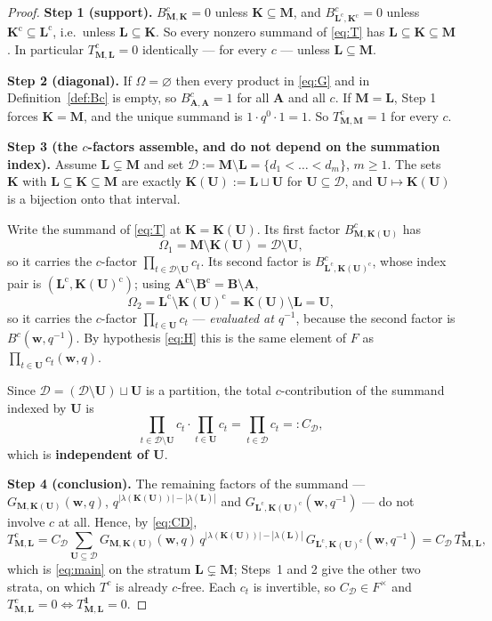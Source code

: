 \documentclass[11pt]{article}
\theoremstyle{plain}
\theoremstyle{definition}
\theoremstyle{remark}
\newcommand{\bM}{\mathbf M}
\newcommand{\bK}{\mathbf K}
\newcommand{\bL}{\mathbf L}
\newcommand{\bU}{\mathbf U}
\newcommand{\bA}{\mathbf A}
\newcommand{\bB}{\mathbf B}
\newcommand{\bw}{\mathbf w}
\newcommand{\cD}{\mathcal D}
\newcommand{\cm}{{\mathrm c}}
\begin{document}
\begin{proof}
\textbf{Step 1 (support).}
$B^c_{\bM,\bK}=0$ unless $\bK\subseteq\bM$, and $B^c_{\bL^\cm,\bK^\cm}=0$ unless
$\bK^\cm\subseteq\bL^\cm$, i.e.\ unless $\bL\subseteq\bK$. So every nonzero
summand of \eqref{eq:T} has $\bL\subseteq\bK\subseteq\bM$. In particular
$T^c_{\bM,\bL}=0$ identically --- for every $c$ --- unless $\bL\subseteq\bM$.

\textbf{Step 2 (diagonal).}
If $\Omega=\varnothing$ then every product in \eqref{eq:G} and in
Definition~\ref{def:Bc} is empty, so $B^c_{\bA,\bA}=1$ for all $\bA$ and all $c$.
If $\bM=\bL$, Step 1 forces $\bK=\bM$, and the unique summand is
$1\cdot q^{0}\cdot1=1$. So $T^c_{\bM,\bM}=1$ for every $c$.

\textbf{Step 3 (the $c$-factors assemble, and do not depend on the summation
index).}
Assume $\bL\subsetneq\bM$ and set $\cD:=\bM\setminus\bL=\{d_1<\dots<d_m\}$,
$m\ge1$. The sets $\bK$ with $\bL\subseteq\bK\subseteq\bM$ are exactly
$\bK(\bU):=\bL\sqcup\bU$ for $\bU\subseteq\cD$, and $\bU\mapsto\bK(\bU)$ is a
bijection onto that interval.

Write the summand of \eqref{eq:T} at $\bK=\bK(\bU)$. Its first factor
$B^c_{\bM,\bK(\bU)}$ has
\[
\Omega_1=\bM\setminus\bK(\bU)=\cD\setminus\bU ,
\]
so it carries the $c$-factor $\prod_{t\in\cD\setminus\bU}c_t$. Its second factor
is $B^c_{\bL^\cm,\bK(\bU)^\cm}$, whose index pair is $(\bL^\cm,\bK(\bU)^\cm)$;
using $\bA^\cm\setminus\bB^\cm=\bB\setminus\bA$,
\[
\Omega_2=\bL^\cm\setminus\bK(\bU)^\cm=\bK(\bU)\setminus\bL=\bU ,
\]
so it carries the $c$-factor $\prod_{t\in\bU}c_t$ --- \emph{evaluated at $q^{-1}$},
because the second factor is $B^c(\bw,q^{-1})$. By hypothesis \eqref{eq:H} this
is the same element of $F$ as $\prod_{t\in\bU}c_t(\bw,q)$.

Since $\cD=(\cD\setminus\bU)\sqcup\bU$ is a partition, the total $c$-contribution
of the summand indexed by $\bU$ is
\begin{equation}
\prod_{t\in\cD\setminus\bU}c_t\cdot\prod_{t\in\bU}c_t
=\prod_{t\in\cD}c_t=:C_\cD ,
\label{eq:CD}
\end{equation}
which is \textbf{independent of $\bU$}.

\textbf{Step 4 (conclusion).}
The remaining factors of the summand --- $G_{\bM,\bK(\bU)}(\bw,q)$,
$q^{|\lambda(\bK(\bU))|-|\lambda(\bL)|}$ and $G_{\bL^\cm,\bK(\bU)^\cm}(\bw,q^{-1})$
--- do not involve $c$ at all. Hence, by \eqref{eq:CD},
\[
T^c_{\bM,\bL}
=C_\cD\sum_{\bU\subseteq\cD}
G_{\bM,\bK(\bU)}(\bw,q)\,
q^{|\lambda(\bK(\bU))|-|\lambda(\bL)|}\,
G_{\bL^\cm,\bK(\bU)^\cm}(\bw,q^{-1})
=C_\cD\,T^{\mathbf 1}_{\bM,\bL},
\]
which is \eqref{eq:main} on the stratum $\bL\subsetneq\bM$; Steps~1 and 2 give the
other two strata, on which $T^c$ is already $c$-free. Each $c_t$ is invertible, so
$C_\cD\in F^\times$ and $T^c_{\bM,\bL}=0\iff T^{\mathbf 1}_{\bM,\bL}=0$.
\end{proof}
\end{document}
